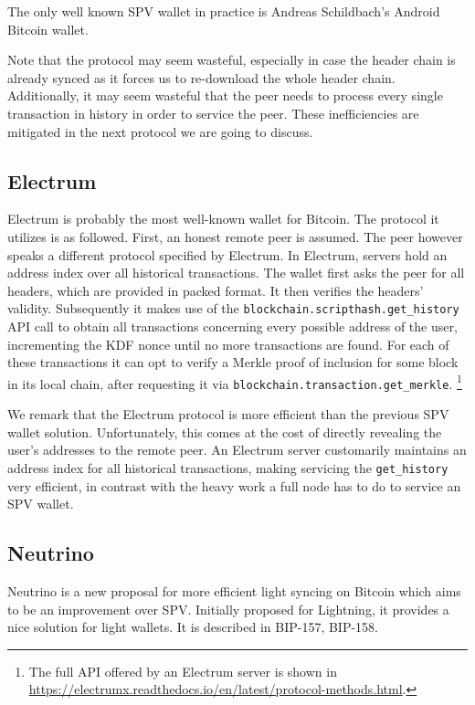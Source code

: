 \documentclass[sigconf]{acmart}
\begin{document}

The only well known SPV wallet in practice is Andreas Schildbach's Android Bitcoin wallet.

Note that the protocol may seem wasteful, especially in case the header chain is already synced as it forces us to re-download the whole header chain. Additionally, it may seem wasteful that the peer needs to process every single transaction in history in order to service the peer. These inefficiencies are mitigated in the next protocol we are going to discuss.


\subsection{Electrum}
Electrum is probably the most well-known wallet for Bitcoin.
The protocol it utilizes is as followed. First, an honest remote peer is assumed. The peer however speaks a different protocol specified by Electrum.
In Electrum, servers hold an address index over all historical transactions.
The wallet first asks the peer for all headers, which are provided in packed format. It then verifies the headers' validity. Subsequently it makes use of the \texttt{blockchain.scripthash.\allowbreak get\_history} API call to obtain all transactions concerning every possible address of the user, incrementing the KDF nonce until no more transactions are found. For each of these transactions it can opt to verify a Merkle proof of inclusion for some block in its local chain, after requesting it via \texttt{blockchain.transaction.\allowbreak get\_merkle}.
\footnote{The full API offered by an Electrum server is shown in \url{https://electrumx.readthedocs.io/en/latest/protocol-methods.html}.
}

We remark that the Electrum protocol is more efficient than the previous SPV wallet solution. Unfortunately, this comes at the cost of directly revealing the user's addresses to the remote peer. An Electrum server customarily maintains an address index for all historical transactions, making servicing the \texttt{get\_history} very efficient, in contrast with the heavy work a full node has to do to service an SPV wallet.
\subsection{Neutrino}
Neutrino is a new proposal for more efficient light syncing on Bitcoin which aims to be an improvement over SPV. Initially proposed for Lightning, it provides a nice solution for light wallets. It is described in BIP-157, BIP-158.
\end{document}
